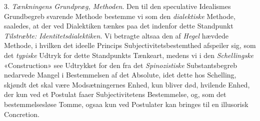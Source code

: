 3. \emph{Tænkningens Grundpræg, Methoden}. Den til den
speculative Idealismes Grundbegreb svarende Methode bestemme
vi som den \emph{dialektiske} Methode, saaledes, at der ved Dialektiken
tænkes paa det indenfor dette Standpunkt \emph{Tilstræbte:
Identitetsdialektiken}. Vi betragte altsaa den af \emph{Hegel}
hævdede Methode, i hvilken det ideelle Princips Subjectivitetsbestemthed
afspeiler sig, som det \emph{typiske} Udtryk for dette
Standpunkts Tænkeart, medens vi i den \emph{Schellingske} «Construction»
see Udtrykket for den fra det \emph{Spinozistiske} Substantsbegreb
nedarvede Mangel i Bestemmelsen af det Absolute,
idet dette hos Schelling, skjøndt det skal være Modsætningernes
Enhed, kun bliver død, hvilende Enhed, der kun ved
et Postulat faaer Subjectivitetens Bestemmelse, og, som det
bestemmelsesløse Tomme, ogsaa kun ved Postulater kan bringes
til en illusorisk Concretion.

